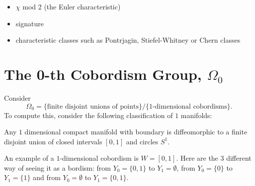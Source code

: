 \begin{ex}
    \hfill
    \begin{itemize}%
        \item $\chi$ mod 2 (the Euler characteristic)
        \item signature
        \item characteristic classes such as Pontrjagin, Stiefel-Whitney or Chern classes 
    \end{itemize}
\end{ex}
\section{The 0-th Cobordism Group, \texorpdfstring{$\Omega_{0}$}{Omega 0}}
Consider
$$\Omega_0 = \{\text{finite disjoint unions of points}\} / \{\text{$1$-dimensional cobordisms}\}.$$
To compute this, consider the following classification of $1$ manifolds:

\begin{prop}\label{prop:classification_1d}
    Any $1$ dimensional compact manifold with boundary is diffeomorphic to a finite disjoint union of closed intervals $[0,1]$ and circles $S^1$.
\end{prop}
\begin{ex}
    An example of a $1$-dimensional cobordism is $W=[0,1]$. Here are the 3 different way of seeing it as a bordism: from $Y_0 = \{0,1\}$ to $Y_1 = \emptyset$, from $Y_0 = \{0\}$ to $Y_1 = \{1\}$ and from $Y_0 = \emptyset$ to $Y_1 = \{0,1\}$.
    \begin{figure}[H]
        \centering
    \end{figure}
\end{ex}

